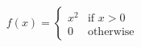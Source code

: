 \documentclass[preview]{standalone}
\begin{document}
\begin{align*}
f(x) = \begin{cases} x^2 & \text{if } x > 0 \\ 0 & \text{otherwise} \end{cases}
\end{align*}
\end{document}
